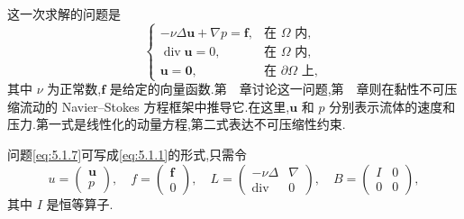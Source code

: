 \begin{example}[(Stokes 问题)]\label{ex:5.1.2}
这一次求解的问题是
\begin{equation}\label{eq:5.1.7}
  \begin{cases}
    -\nu\Delta\boldsymbol{u}+\nabla p=\boldsymbol{f},&\text{在 }\Omega\text{ 内},\\
    \operatorname{div}\boldsymbol{u}=0,&\text{在 }\Omega\text{ 内},\\
    \boldsymbol{u}=\boldsymbol{0},&\text{在 }\partial\Omega\text{ 上},
  \end{cases}
\end{equation}
其中 \(\nu\) 为正常数,\(\boldsymbol{f}\) 是给定的向量函数.第~~章讨论这一问题,第~~章则在黏性不可压缩流动的 Navier--Stokes 方程框架中推导它.在这里,\(\boldsymbol{u}\) 和 \(p\) 分别表示流体的速度和压力.第一式是线性化的动量方程,第二式表达不可压缩性约束.

问题\eqref{eq:5.1.7}可写成\eqref{eq:5.1.1}的形式,只需令
\[
  u=\begin{pmatrix}\boldsymbol{u}\\p\end{pmatrix},\quad
  f=\begin{pmatrix}\boldsymbol{f}\\0\end{pmatrix},\quad
  L=\begin{pmatrix}-\nu\Delta&\nabla\\\operatorname{div}&0\end{pmatrix},\quad
  B=\begin{pmatrix}I&0\\0&0\end{pmatrix},
\]
其中 \(I\) 是恒等算子.


\end{example}
